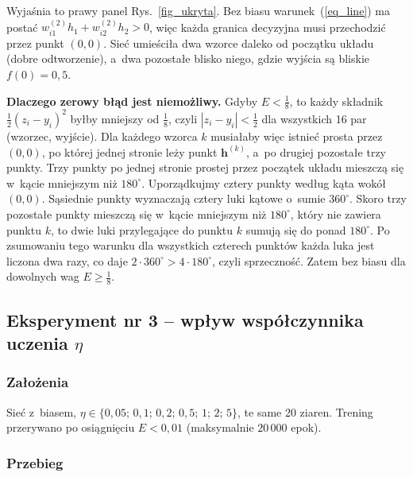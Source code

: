 \documentclass[12pt]{article}
\begin{document}
Wyjaśnia to prawy panel Rys.~\ref{fig_ukryta}. Bez biasu warunek~(\ref{eq_line}) ma postać
$w_{i1}^{(2)}h_1 + w_{i2}^{(2)}h_2 > 0$, więc każda granica decyzyjna musi przechodzić przez
punkt $(0,0)$. Sieć umieściła dwa wzorce daleko od początku układu (dobre odtworzenie), a~dwa
pozostałe blisko niego, gdzie wyjścia są bliskie $f(0)=0{,}5$.

\textbf{Dlaczego zerowy błąd jest niemożliwy.} Gdyby $E<\tfrac18$, to każdy składnik
$\tfrac12(z_i-y_i)^2$ byłby mniejszy od $\tfrac18$, czyli $|z_i-y_i|<\tfrac12$ dla wszystkich
16 par (wzorzec, wyjście). Dla każdego wzorca $k$ musiałaby więc istnieć prosta przez $(0,0)$,
po której jednej stronie leży punkt $\mathbf{h}^{(k)}$, a~po drugiej pozostałe trzy punkty. Trzy
punkty po jednej stronie prostej przez początek układu mieszczą się w~kącie mniejszym niż
$180^\circ$. Uporządkujmy cztery punkty według kąta wokół $(0,0)$. Sąsiednie punkty wyznaczają
cztery luki kątowe o~sumie $360^\circ$. Skoro trzy pozostałe punkty mieszczą się w~kącie mniejszym
niż $180^\circ$, który nie zawiera punktu $k$, to dwie luki przylegające do punktu $k$ sumują się
do ponad $180^\circ$. Po zsumowaniu tego warunku dla wszystkich czterech punktów każda luka jest
liczona dwa razy, co daje $2\cdot360^\circ>4\cdot180^\circ$, czyli sprzeczność. Zatem bez biasu dla dowolnych wag $E\ge\tfrac18$.


\newpage
\subsection{Eksperyment nr 3 -- wpływ współczynnika uczenia $\eta$}

\subsubsection{Założenia}

Sieć z~biasem, $\eta\in\{0{,}05;\,0{,}1;\,0{,}2;\,0{,}5;\,1;\,2;\,5\}$, te same 20 ziaren.
Trening przerywano po osiągnięciu $E<0{,}01$ (maksymalnie $20\,000$ epok).

\subsubsection{Przebieg}
\end{document}
